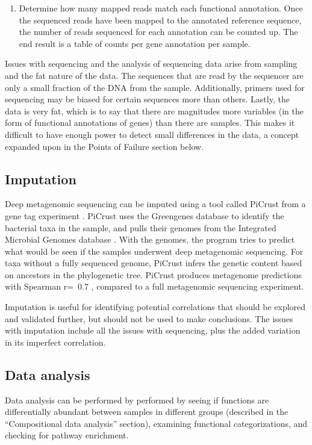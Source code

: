 \begin{enumerate}
\item Determine how many mapped reads match each functional annotation.
Once the sequenced reads have been mapped to the annotated reference sequence, the number of reads sequenced for each annotation can be counted up. The end result is a table of counts per gene annotation per sample.
\end{enumerate}

Issues with sequencing and the analysis of sequencing data arise from sampling and the fat nature of the data. The sequences that are read by the sequencer are only a small fraction of the DNA from the sample. Additionally, primers used for sequencing may be biased for certain sequences more than others. Lastly, the data is very fat, which is to say that there are magnitudes more variables (in the form of functional annotations of genes) than there are samples. This makes it difficult to have enough power to detect small differences in the data, a concept expanded upon in the Points of Failure section below.

\FloatBarrier

\subsection{Imputation}
Deep metagenomic sequencing can be imputed using a tool called PiCrust from a gene tag experiment \cite{langille2013predictive}. PiCrust uses the Greengenes database \cite{desantis2006greengenes} to identify the bacterial taxa in the sample, and pulls their genomes from the Integrated Microbial Genomes database \cite{markowitz2012img}. With the genomes, the program tries to predict what would be seen if the samples underwent deep metagenomic sequencing. For taxa without a fully sequenced genome, PiCrust infers the genetic content based on ancestors in the phylogenetic tree. PiCrust produces metagenome predictions with Spearman r=~0.7 \cite{langille2013predictive}, compared to a full metagenomic sequencing experiment.

Imputation is useful for identifying potential correlations that should be explored and validated further, but should not be used to make conclusions. The issues with imputation include all the issues with sequencing, plus the added variation in its imperfect correlation.

\subsection{Data analysis}
Data analysis can be performed by performed by seeing if functions are differentially abundant between samples in different groups (described in the “Compositional data analysis” section), examining functional categorizations, and checking for pathway enrichment.


